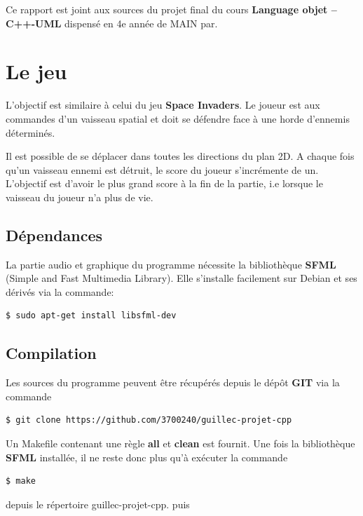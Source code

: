 \documentclass{article}
\begin{document}
Ce rapport est joint aux sources du projet final du cours \textbf{Language objet – C++-UML} dispensé en 4e année de MAIN par.

\section{Le jeu}

L'objectif est similaire à celui du jeu \textbf{Space Invaders}. Le joueur est aux commandes d'un vaisseau spatial et doit se défendre face à une horde d'ennemis déterminés.

Il est possible de se déplacer dans toutes les directions du plan 2D. A chaque fois qu'un vaisseau ennemi est détruit, le score du joueur s'incrémente de un. L'objectif est d'avoir le plus grand score à la fin de la partie, i.e lorsque le vaisseau du joueur n'a plus de vie.

\subsection{Dépendances}

La partie audio et graphique du programme nécessite la bibliothèque \textbf{SFML} (Simple and Fast Multimedia Library). Elle s'installe facilement sur Debian et ses dérivés via la commande:

\begin{lstlisting}[language=bash]
$ sudo apt-get install libsfml-dev
\end{lstlisting}

\subsection{Compilation}

Les sources du programme peuvent être récupérés depuis le dépôt \textbf{GIT} via la commande

\begin{lstlisting}[language=bash]
$ git clone https://github.com/3700240/guillec-projet-cpp
\end{lstlisting}

Un Makefile contenant une règle \textbf{all} et \textbf{clean} est fournit. Une fois la bibliothèque \textbf{SFML} installée, il ne reste donc plus qu'à exécuter la commande

\begin{lstlisting}[language=bash]
$ make
\end{lstlisting}

depuis le répertoire guillec-projet-cpp. puis
\end{document}
